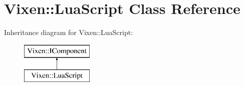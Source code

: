 \hypertarget{class_vixen_1_1_lua_script}{}\section{Vixen\+:\+:Lua\+Script Class Reference}
\label{class_vixen_1_1_lua_script}
Inheritance diagram for Vixen\+:\+:Lua\+Script\+:\begin{figure}[H]
\begin{center}
\leavevmode
\includegraphics[height=2.000000cm]{class_vixen_1_1_lua_script}
\end{center}
\end{figure}
